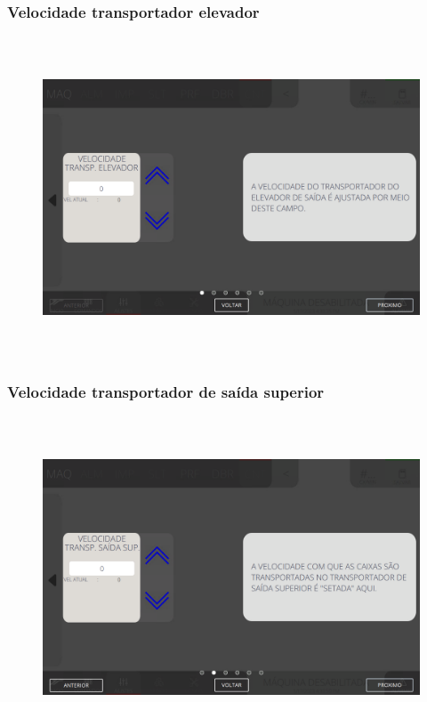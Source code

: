 \newpage
\thispagestyle{fancy}
\vspace*{40 pt}
\subsubsection{\small{Velocidade transportador elevador}}
\vspace*{\fill}
\begin{figure}[h]
  \centering
  \includegraphics[width=576px,height=360px]{src/imagesFlexo/08-count/settings/e-7.png}
\end{figure}
\vspace*{\fill}


\newpage
\thispagestyle{fancy}
\vspace*{40 pt}
\subsubsection{\small{Velocidade transportador de saída superior}}
\vspace*{\fill}
\begin{figure}[h]
  \centering
  \includegraphics[width=576px,height=360px]{src/imagesFlexo/08-count/settings/e-8.png}
\end{figure}
\vspace*{\fill}


